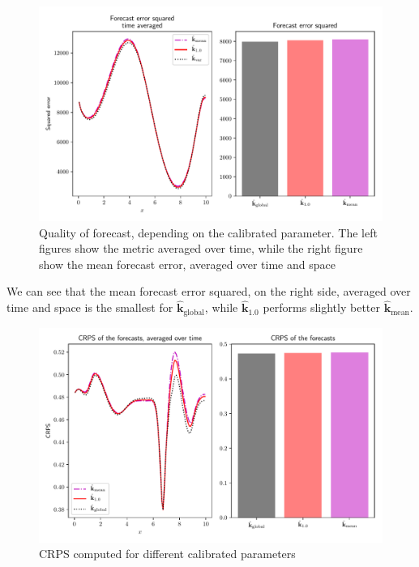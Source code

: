 \documentclass[preprint, 1p]{elsarticle}
\newcommand{\hatkmean}{\hat{\mathbf{k}}_{\mathrm{mean}}}
\newcommand{\kest}{\hat{\mathbf{k}}}
\newcommand{\victor}[1]{{\itshape\color{green} ({#1})}}
\begin{document}
\begin{figure}[!h]
\centering
\includegraphics[width=.9\textwidth]{Figures/forecast_error.pdf}
\caption{Quality of forecast, depending on the calibrated parameter. The left figures show the metric averaged over time, while the right figure show the mean forecast error, averaged over time and space}
\label{fig:forecast_squared_error}
\end{figure}
We can see that the mean forecast error squared, on the right side, averaged over time and space is the smallest for $\kest_{\mathrm{global}}$, while $\kest_{1.0}$ performs slightly better $\hatkmean$.
\begin{figure}[!h]
  \centering
  \includegraphics[width=.9\textwidth]{Figures/forecast_CRPS}
  \caption{CRPS computed for different calibrated parameters}
\label{fig:forecast_crps}
\end{figure}

\end{document}

